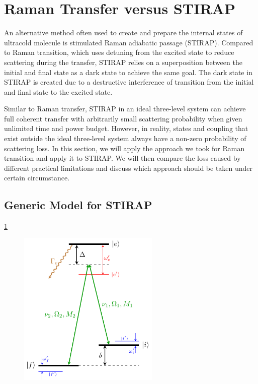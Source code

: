 
\section{Raman Transfer versus STIRAP}

An alternative method often used to create and prepare the internal states of ultracold molecule
is stimulated Raman adiabatic passage (STIRAP)\todo{\cite{}}.
Compared to Raman transition, which uses detuning from the excited state
to reduce scattering during the transfer, STIRAP relies on a superposition between
the initial and final state as a dark state to achieve the same goal.
The dark state in STIRAP is created due to a destructive interference of transition
from the initial and final state to the excited state.

Similar to Raman transfer, STIRAP in an ideal three-level system can achieve
full coherent transfer with arbitrarily small scattering probability
when given unlimited time and power budget.
However, in reality, states and coupling that exist outside the ideal three-level system
always have a non-zero probability of scattering loss.
In this section, we will apply the approach we took for Raman transition
and apply it to STIRAP. We will then compare the loss caused by different practical limitations
and discuss which approach should be taken under certain circumstance.

\subsection{Generic Model for STIRAP}

\ref{fig:raman-transfer-generic-stirap-model}

\begin{figure}
  \centering
  \includegraphics[width=0.6\textwidth]{figures/raman_transfer_generic_raman_model.pdf}
  \caption[Generic model for a real STIRAP]{
    \todo{}
    \label{fig:raman-transfer-generic-stirap-model}}
\end{figure}

